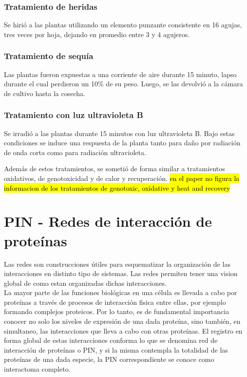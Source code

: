 \subsubsection*{Tratamiento de heridas}
Se hirió a las plantas utilizando un elemento punzante consistente en 16 agujas, tres veces por hoja, dejando en promedio entre 3 y 4 agujeros.
\subsubsection*{Tratamiento de sequía}
Las plantas fueron expuestas a una corriente de aire durante 15 minuto, lapso durante el cual perdieron un 10\% de su peso. Luego, se las devolvió a la cámara de cultivo hasta la cosecha.
\subsubsection*{Tratamiento con luz ultravioleta B}
Se irradió a las plantas durante 15 minutos con luz ultravioleta B. Bajo estas condiciones se induce una respuesta de la planta tanto para daño por radiación de onda corta como para radiación ultravioleta.

Además de estos tratamientos, se sometió de forma similar a tratamientos oxidativos, de genotoxicidad y de calor y recuperación.
\hl{en el paper no figura la informacion de los tratamientos de genotoxic, oxidative y heat and recovery}
\cite{AtGenExpress, Kilian2007}
\section{PIN - Redes de interacción de proteínas}
\label{sec:redes}
Las redes son construcciones útiles para esquematizar la organización de las interacciones en distinto tipo de sistemas. Las redes permiten tener una vision global de como estan organizadas dichas interacciones.\\
La mayor parte de las funciones biológicas en una célula es llevada a cabo por proteínas a través de procesos de interacción fisica entre ellas, por ejemplo formando complejos proteicos. Por lo tanto, es de fundamental importancia conocer no solo los niveles de expresión de una dada proteína, sino también, en simultaneo, las interacciones que lleva a cabo con otras proteínas. El registro en forma global de estas interacciones conforma lo que se denomina red de interacción de proteínas o PIN, y si la misma contempla la totalidad de las proteínas de una dada especie, la PIN correspondiente se conoce como interactoma completo.\\
